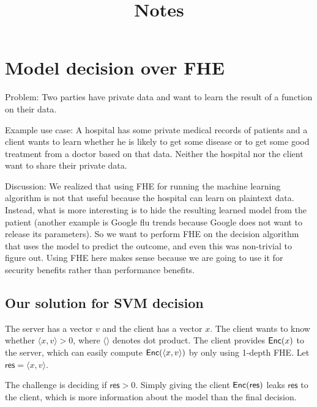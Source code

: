 \documentclass[11pt]{article}
\title{Notes}
\begin{document}
\date{}

\maketitle

\vspace{-2cm}


\section{Model decision over FHE}

Problem: Two parties have private data and want to learn the result of a function on their data. 

\noindent Example use case:  A hospital  has some private medical records of patients and a client wants to learn whether he is likely to get some disease or to get some good treatment from a doctor based on that data. Neither the hospital nor the client want to share their private data. 

Discussion:
We realized that using FHE for running the machine learning algorithm is not that useful because the hospital can learn on plaintext data. Instead, what is more interesting is to hide the resulting learned model from the patient (another example is Google flu trends because Google does not want to release its parameters). So we want to perform FHE on the decision algorithm that uses the model to predict the outcome, and even this was non-trivial to figure out.
Using FHE here makes sense because we are going to use it for security benefits rather than performance benefits. 


\subsection{Our solution for SVM decision}

\newcommand{\res}{\mathsf{res}}

The server has a vector $v$ and the client has a vector $x$. The client wants to know whether $\langle x, v \rangle > 0$, where 
$\langle \rangle$ denotes dot product. 
The client provides $\mathsf{Enc}(x)$ to the server, which can easily compute $\mathsf{Enc}(\langle x, v \rangle)$ by only using 1-depth FHE. Let $\res = \langle x, v \rangle$. 



The challenge is deciding if $\res > 0$. Simply giving the client $\enc(\res)$ leaks $\res$ to the client, which is more information about the model than the final decision. 
\end{document}
